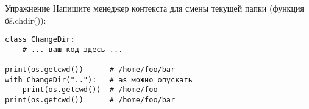 \begin{frame}[fragile]{Упражнение}
	Напишите менеджер контекста для смены текущей папки (функция \t{os.chdir()}):
\begin{verbatim}
class ChangeDir:
    # ... ваш код здесь ...

print(os.getcwd())      # /home/foo/bar
with ChangeDir(".."):   # as можно опускать
    print(os.getcwd())  # /home/foo
print(os.getcwd())      # /home/foo/bar
\end{verbatim}
\end{frame}
